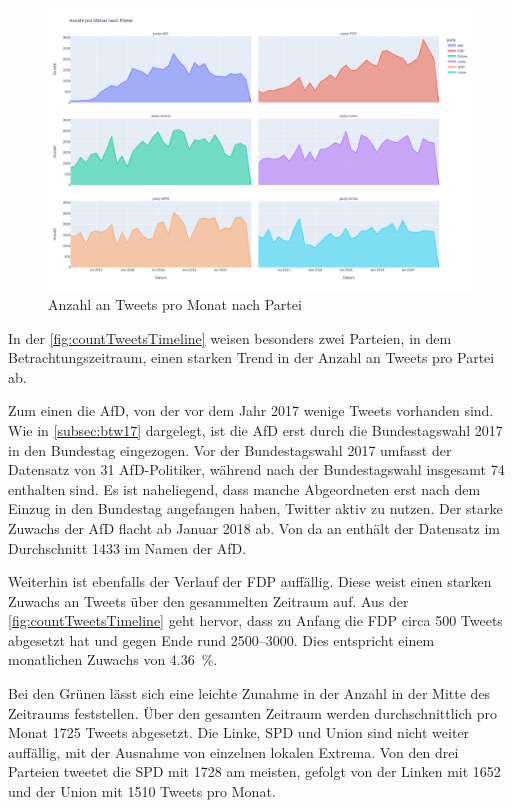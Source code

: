 \begin{figure}[H]
    \centering
    \includegraphics[width=\textwidth]{data/images/tweets/anzahl_pro_monat_nach_partei.png}
    \caption{Anzahl an Tweets pro Monat nach Partei} \label{fig:countTweetsTimeline}
\end{figure}

In der \autoref{fig:countTweetsTimeline} weisen besonders zwei Parteien, in dem Betrachtungszeitraum, einen starken Trend in der Anzahl an Tweets pro Partei ab.

Zum einen die \ac{AfD}, von der vor dem Jahr \num{2017} wenige Tweets vorhanden sind. Wie in \autoref{subsec:btw17} dargelegt, ist die \ac{AfD} erst durch die Bundestagswahl \num{2017} in den Bundestag eingezogen. Vor der Bundestagswahl \num{2017} umfasst der Datensatz von \textcite{saltzer_bundestagswahl_2022} \num{31} \ac{AfD}-Politiker, während nach der Bundestagswahl insgesamt \num{74} enthalten sind. Es ist naheliegend, dass manche Abgeordneten erst nach dem Einzug in den Bundestag angefangen haben, Twitter aktiv zu nutzen. Der starke Zuwachs der \ac{AfD} flacht ab Januar \num{2018} ab. Von da an enthält der Datensatz im Durchschnitt \num{1433} im Namen der \ac{AfD}.

Weiterhin ist ebenfalls der Verlauf der \ac{FDP} auffällig. Diese weist einen starken Zuwachs an Tweets über den gesammelten Zeitraum auf. Aus der \autoref{fig:countTweetsTimeline} geht hervor, dass zu Anfang die \ac{FDP} circa \num{500} Tweets abgesetzt hat und gegen Ende rund \numrange{2500}{3000}. Dies entspricht einem monatlichen Zuwachs von \SI{4.36}{\percent}.

Bei den Grünen lässt sich eine leichte Zunahme in der Anzahl in der Mitte des Zeitraums feststellen. Über den gesamten Zeitraum werden durchschnittlich pro Monat \num{1725} Tweets abgesetzt. Die Linke, \ac{SPD} und Union sind nicht weiter auffällig, mit der Ausnahme von einzelnen lokalen Extrema. Von den drei Parteien tweetet die \ac{SPD} mit \num{1728} am meisten, gefolgt von der Linken mit \num{1652} und der Union mit \num{1510} Tweets pro Monat.


